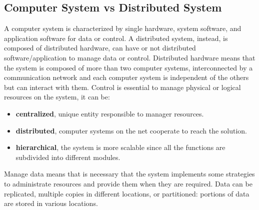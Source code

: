 \subsection{Computer System vs Distributed System}
A computer system is characterized by single hardware, system software, and application software for data or control. A distributed system, instead, is composed of distributed hardware, can have or not distributed software/application to manage data or control.
Distributed hardware means that the system is composed of more than two computer systems, interconnected by a communication network and each computer system is independent of the others but can interact with them.
Control is essential to manage physical or logical resources on the system, it can be:
\begin{itemize}
    \item \textbf{centralized}, unique entity responsible to manager resources.
    \item \textbf{distributed}, computer systems on the net cooperate to reach the solution.
    \item \textbf{hierarchical}, the system is more scalable since all the functions are subdivided into different modules.
\end{itemize}
Manage data means that is necessary that the system implements some strategies to administrate resources and provide them when they are required. Data can be replicated, multiple copies in different locations, or partitioned: portions of data are stored in various locations.

